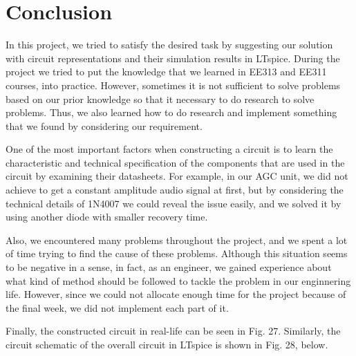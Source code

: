 \documentclass[conference]{IEEEtran}
\begin{document}
\section{Conclusion}
In this project, we tried to satisfy the desired task by suggesting our solution with circuit representations and their simulation results in LTspice. During the project we tried to put the knowledge that we learned in EE313 and EE311 courses, into practice. However, sometimes it is not sufficient to solve problems based on our prior knowledge so that it necessary to do research to solve problems. Thus, we also learned how to do research and implement something that we found by considering our requirement. \\
\par  One of the most important factors when constructing a circuit is to learn the characteristic and technical specification of the components that are used in the circuit by examining their datasheets. For example, in our AGC unit, we did not achieve to get a constant amplitude audio signal at first, but by considering the technical details of 1N4007 we could reveal the issue easily, and we solved it by using another diode with smaller recovery time. \\
\par Also, we encountered many problems throughout the project, and we spent a lot of time trying to find the cause of these problems. Although this situation seems to be negative in a sense, in fact, as an engineer, we gained experience about what kind of method should be followed to tackle the problem in our enginnering life. However, since we could not allocate enough time for the project because of the final week, we did not implement each part of it. \\
\par Finally, the constructed circuit in real-life can be seen in Fig. 27. Similarly, the circuit schematic of the overall circuit in LTspice is shown in Fig. 28, below.  
\end{document}
